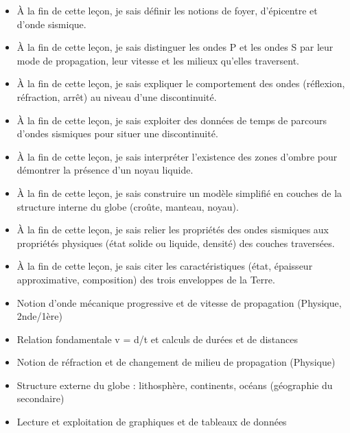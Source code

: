 \documentclass[11pt]{article}
\begin{document}
\begin{objectifs}
\begin{itemize}
\item À la fin de cette leçon, je sais définir les notions de foyer, d'épicentre et d'onde sismique.
\item À la fin de cette leçon, je sais distinguer les ondes P et les ondes S par leur mode de propagation, leur vitesse et les milieux qu'elles traversent.
\item À la fin de cette leçon, je sais expliquer le comportement des ondes (réflexion, réfraction, arrêt) au niveau d'une discontinuité.
\item À la fin de cette leçon, je sais exploiter des données de temps de parcours d'ondes sismiques pour situer une discontinuité.
\item À la fin de cette leçon, je sais interpréter l'existence des zones d'ombre pour démontrer la présence d'un noyau liquide.
\item À la fin de cette leçon, je sais construire un modèle simplifié en couches de la structure interne du globe (croûte, manteau, noyau).
\item À la fin de cette leçon, je sais relier les propriétés des ondes sismiques aux propriétés physiques (état solide ou liquide, densité) des couches traversées.
\item À la fin de cette leçon, je sais citer les caractéristiques (état, épaisseur approximative, composition) des trois enveloppes de la Terre.
\end{itemize}
\end{objectifs}

\begin{prerequis}
\begin{itemize}
\item Notion d'onde mécanique progressive et de vitesse de propagation (Physique, 2nde/1ère)
\item Relation fondamentale v = d/t et calculs de durées et de distances
\item Notion de réfraction et de changement de milieu de propagation (Physique)
\item Structure externe du globe : lithosphère, continents, océans (géographie du secondaire)
\item Lecture et exploitation de graphiques et de tableaux de données
\end{itemize}
\end{prerequis}

\newpage
\end{document}
